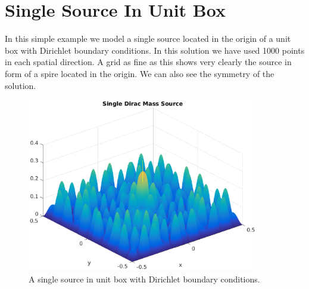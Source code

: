 \documentclass[10pt,a4paper]{article}
\begin{document}
\section*{Single Source In Unit Box}
In this simple example we model a single source located in the origin of a unit box with Dirichlet boundary conditions. In this solution we have used 1000 points in each spatial direction. A grid as fine as this shows very clearly the source in form of a spire located in the origin. We can also see the symmetry of the solution.

\begin{figure}[H]
\centering
    \includegraphics[width=0.9\textwidth]{figures/SingleSource_2D_1000.eps}
	\caption{A single source in unit box with Dirichlet boundary conditions.}
  \label{fig:singleSource1000}
\end{figure}
\end{document}
